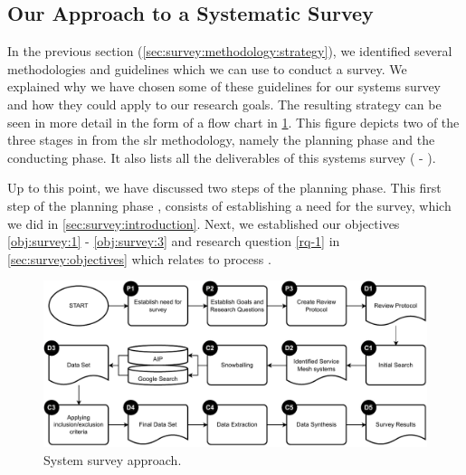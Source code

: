 \subsection{Our Approach to a Systematic Survey}
\label{sec:survey:methodology:approach}

In the previous section (\cref{sec:survey:methodology:strategy}), we identified several methodologies and guidelines which we can use to conduct a survey. We explained why we have chosen some of these guidelines for our systems survey and how they could apply to our research goals. The resulting strategy can be seen in more detail in the form of a flow chart in  \cref{fig:survey-methodology}. This figure depicts two of the three stages in from the \gls{slr} methodology, namely the planning phase and the conducting phase. It also lists all the deliverables of this systems survey ( - ). 

Up to this point, we have discussed two steps of the planning phase. This first step of the planning phase , consists of establishing a need for the survey, which we did in \cref{sec:survey:introduction}. Next, we established our objectives \ref{obj:survey:1} - \ref{obj:survey:3} and research question \ref{rq-1} in \cref{sec:survey:objectives} which relates to process .




\begin{figure}[!t]
    \centering
    
    \includegraphics[width=\linewidth]{3_systems_survey/figures/survey-methodology}

    \caption[System survey approach.]{System survey approach.}
    \label{fig:survey-methodology}
\end{figure}




